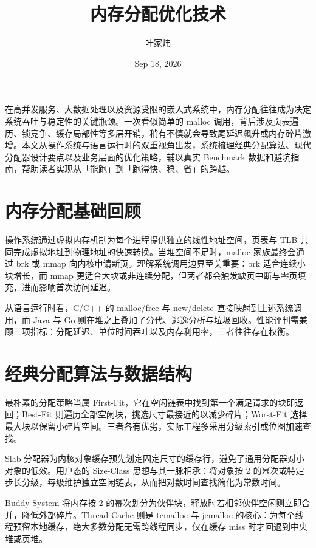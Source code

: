 \title{内存分配优化技术}
\author{叶家炜}
\date{Sep 18, 2026}
\maketitle
在高并发服务、大数据处理以及资源受限的嵌入式系统中，内存分配往往成为决定系统吞吐与稳定性的关键瓶颈。一次看似简单的 malloc 调用，背后涉及页表遍历、锁竞争、缓存局部性等多层开销，稍有不慎就会导致尾延迟飙升或内存碎片激增。本文从操作系统与语言运行时的双重视角出发，系统梳理经典分配算法、现代分配器设计要点以及业务层面的优化策略，辅以真实 Benchmark 数据和避坑指南，帮助读者实现从「能跑」到「跑得快、稳、省」的跨越。\par
\chapter{内存分配基础回顾}
操作系统通过虚拟内存机制为每个进程提供独立的线性地址空间，页表与 TLB 共同完成虚拟地址到物理地址的快速转换。当堆空间不足时，malloc 家族最终会通过 brk 或 mmap 向内核申请新页。理解系统调用边界至关重要：brk 适合连续小块增长，而 mmap 更适合大块或非连续分配，但两者都会触发缺页中断与零页填充，进而影响首次访问延迟。\par
从语言运行时看，C/C++ 的 malloc/free 与 new/delete 直接映射到上述系统调用，而 Java 与 Go 则在堆之上叠加了分代、逃逸分析与垃圾回收。性能评判需兼顾三项指标：分配延迟、单位时间吞吐以及内存利用率，三者往往存在权衡。\par
\chapter{经典分配算法与数据结构}
最朴素的分配策略当属 First-Fit，它在空闲链表中找到第一个满足请求的块即返回；Best-Fit 则遍历全部空闲块，挑选尺寸最接近的以减少碎片；Worst-Fit 选择最大块以保留小碎片空间。三者各有优劣，实际工程多采用分级索引或位图加速查找。\par
Slab 分配器为内核对象缓存预先划定固定尺寸的缓存行，避免了通用分配器对小对象的低效。用户态的 Size-Class 思想与其一脉相承：将对象按 2 的幂次或特定步长分级，每级维护独立空闲链表，从而把对数时间查找简化为常数时间。\par
Buddy System 将内存按 2 的幂次划分为伙伴块，释放时若相邻伙伴空闲则立即合并，降低外部碎片。Thread-Cache 则是 tcmalloc 与 jemalloc 的核心：为每个线程预留本地缓存，绝大多数分配无需跨线程同步，仅在缓存 miss 时才回退到中央堆或页堆。\par
